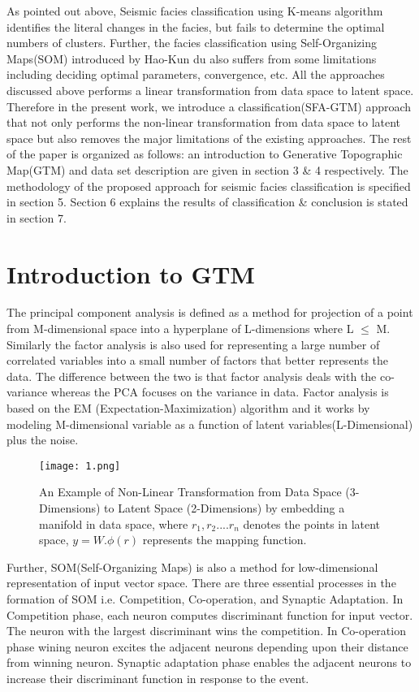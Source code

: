 \documentclass[a4paper]{article}
\begin{document}
As pointed out above, Seismic facies classification using K-means algorithm\cite{sabeti} identifies the literal changes in the facies, but fails to determine the optimal numbers of clusters. Further, the facies classification using Self-Organizing Maps(SOM)\cite{atish} introduced by Hao-Kun du also suffers from some limitations including deciding optimal parameters, convergence, etc. All the approaches discussed above performs a linear transformation from data space to latent space. Therefore in the present work, we introduce a classification(SFA-GTM) approach that not only performs the non-linear transformation from data space to latent space but also removes the major limitations of the existing approaches. The rest of the paper is organized as follows: an introduction to Generative Topographic Map(GTM) and data set description are given in section 3 \& 4 respectively. The methodology of the proposed approach for seismic facies classification is specified in section 5. Section 6 explains the results of classification \& conclusion is stated in section 7.  

\section{Introduction to GTM}
The principal component analysis\cite{pca} is defined as a method for projection of a point from M-dimensional space into a hyperplane of L-dimensions where L $\leq$ M. Similarly the factor analysis\cite{fa} is also used for representing a large number of correlated variables into a small number of factors that better represents the data. The difference between the two is that factor analysis deals with the co-variance whereas the PCA focuses on the variance in data\cite{fpca}. Factor analysis is based on the EM\cite{em} (Expectation-Maximization) algorithm and it works by modeling M-dimensional variable as a function of latent variables(L-Dimensional) plus the noise. 
\begin{figure}[htbp]
\centering
\texttt{[image: 1.png]}
\label{An Example of Non-Linear Transformation from Data Space(3-Dimensions) to Latent Space(2-Dimensions)}
\caption{An Example of Non-Linear Transformation from Data Space (3-Dimensions) to Latent Space (2-Dimensions) by embedding a manifold in data space\cite{figurecitation}, where {$r_{1},r_{2}....r_{n}$ denotes the points in latent space, $y=W.\phi(r)$ represents the mapping function.}}
\end{figure}
Further, SOM(Self-Organizing Maps)\cite{som} is also a method for low-dimensional representation of input vector space. There are three essential processes in the formation of SOM i.e. Competition, Co-operation, and Synaptic Adaptation. In Competition phase, each neuron computes discriminant function for input vector. The neuron with the largest discriminant wins the competition. In Co-operation phase wining neuron excites the adjacent neurons depending upon their distance from winning neuron. Synaptic adaptation phase enables the adjacent neurons to increase their discriminant function in response to the event. \smallbreak
\end{document}
